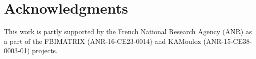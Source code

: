 \documentclass{article}
\begin{document}
\printAffiliationsAndNotice{}  %



















\section*{Acknowledgments}
This work is partly supported by the French National Research Agency (ANR) as a part of the FBIMATRIX
(ANR-16-CE23-0014) and KAMoulox (ANR-15-CE38-0003-01) projects.



\end{document}
